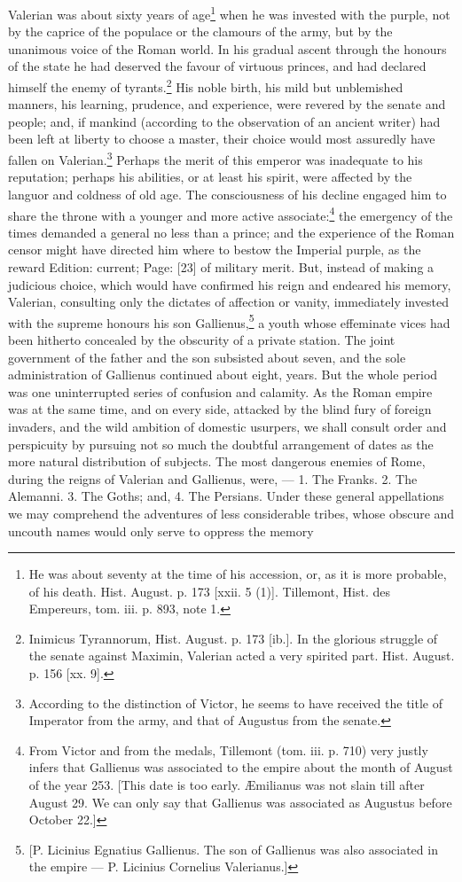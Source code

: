 Valerian was about sixty years of age\footnote{He was about seventy at the time of his accession, or, as it is more probable, of his death. Hist. August. p. 173 [xxii. 5 (1)]. Tillemont, Hist. des Empereurs, tom. iii. p. 893, note 1.} when he was invested with the purple, not by the caprice of the populace or the clamours of the army, but by the unanimous voice of the Roman world. In his gradual ascent through the honours of the state he had deserved the favour of virtuous princes, and had declared himself the enemy of tyrants.\footnote{Inimicus Tyrannorum, Hist. August. p. 173 [ib.]. In the glorious struggle of the senate against Maximin, Valerian acted a very spirited part. Hist. August. p. 156 [xx. 9].} His noble birth, his mild but unblemished manners, his learning, prudence, and experience, were revered by the senate and people; and, if mankind (according to the observation of an ancient writer) had been left at liberty to choose a master, their choice would most assuredly have fallen on Valerian.\footnote{According to the distinction of Victor, he seems to have received the title of Imperator from the army, and that of Augustus from the senate.} Perhaps the merit of this emperor was inadequate to his reputation; perhaps his abilities, or at least his spirit, were affected by the languor and coldness of old age. The consciousness of his decline engaged him to share the throne with a younger and more active associate:\footnote{From Victor and from the medals, Tillemont (tom. iii. p. 710) very justly infers that Gallienus was associated to the empire about the month of August of the year 253. [This date is too early. Æmilianus was not slain till after August 29. We can only say that Gallienus was associated as Augustus before October 22.]} the emergency of the times demanded a general no less than a prince; and the experience of the Roman censor might have directed him where to bestow the Imperial purple, as the reward Edition: current; Page: [23] of military merit. But, instead of making a judicious choice, which would have confirmed his reign and endeared his memory, Valerian, consulting only the dictates of affection or vanity, immediately invested with the supreme honours his son Gallienus,\footnote{[P. Licinius Egnatius Gallienus. The son of Gallienus was also associated in the empire \texthebrew{—} P. Licinius Cornelius Valerianus.]} a youth whose effeminate vices had been hitherto concealed by the obscurity of a private station. The joint government of the father and the son subsisted about seven, and the sole administration of Gallienus continued about eight, years. But the whole period was one uninterrupted series of confusion and calamity. As the Roman empire was at the same time, and on every side, attacked by the blind fury of foreign invaders, and the wild ambition of domestic usurpers, we shall consult order and perspicuity by pursuing not so much the doubtful arrangement of dates as the more natural distribution of subjects. The most dangerous enemies of Rome, during the reigns of Valerian and Gallienus, were, \texthebrew{—} 1. The Franks. 2. The Alemanni. 3. The Goths; and, 4. The Persians. Under these general appellations we may comprehend the adventures of less considerable tribes, whose obscure and uncouth names would only serve to oppress the memory 